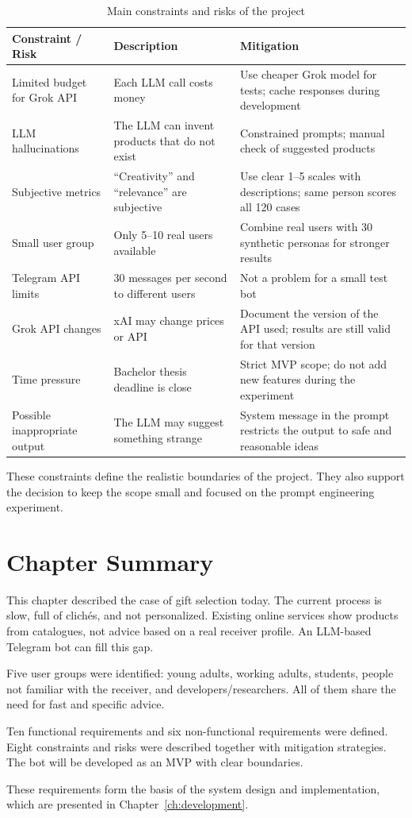 \begin{table}[H]
\centering
\caption{Main constraints and risks of the project}
\label{tab:risks}
\begin{tabular}{p{4cm} p{5cm} p{5cm}}
\toprule
\textbf{Constraint / Risk} & \textbf{Description} & \textbf{Mitigation} \\
\midrule
Limited budget for Grok API & Each LLM call costs money & Use cheaper Grok model for tests; cache responses during development \\
LLM hallucinations & The LLM can invent products that do not exist & Constrained prompts; manual check of suggested products \\
Subjective metrics & ``Creativity'' and ``relevance'' are subjective & Use clear 1--5 scales with descriptions; same person scores all 120 cases \\
Small user group & Only 5--10 real users available & Combine real users with 30 synthetic personas for stronger results \\
Telegram API limits & 30 messages per second to different users & Not a problem for a small test bot \\
Grok API changes & xAI may change prices or API & Document the version of the API used; results are still valid for that version \\
Time pressure & Bachelor thesis deadline is close & Strict MVP scope; do not add new features during the experiment \\
Possible inappropriate output & The LLM may suggest something strange & System message in the prompt restricts the output to safe and reasonable ideas \\
\bottomrule
\end{tabular}
\end{table}

These constraints define the realistic boundaries of the project. They also support the decision to keep the scope small and focused on the prompt engineering experiment.

\section{Chapter Summary}
\label{sec:ch2-summary}

This chapter described the case of gift selection today. The current process is slow, full of clichés, and not personalized. Existing online services show products from catalogues, not advice based on a real receiver profile. An LLM-based Telegram bot can fill this gap.

Five user groups were identified: young adults, working adults, students, people not familiar with the receiver, and developers/researchers. All of them share the need for fast and specific advice.

Ten functional requirements and six non-functional requirements were defined. Eight constraints and risks were described together with mitigation strategies. The bot will be developed as an MVP with clear boundaries.

These requirements form the basis of the system design and implementation, which are presented in Chapter~\ref{ch:development}.
